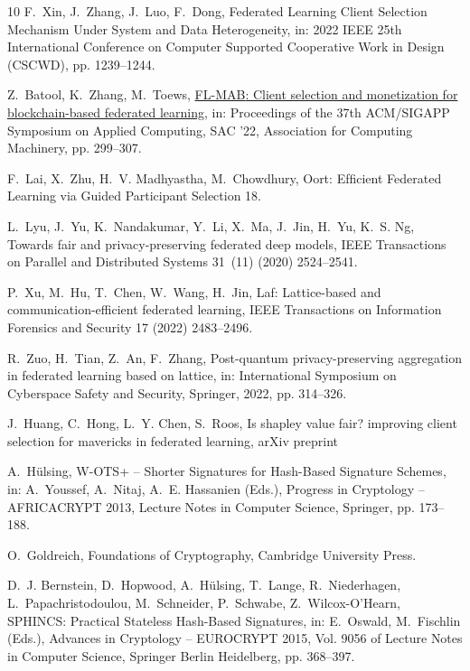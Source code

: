 \documentclass[lettersize,journal]{IEEEtran}
\begin{document}
\begin{thebibliography}{10}
F.~Xin, J.~Zhang, J.~Luo, F.~Dong, Federated {{Learning Client Selection
  Mechanism Under System}} and {{Data Heterogeneity}}, in: 2022 {{IEEE}} 25th
  {{International Conference}} on {{Computer Supported Cooperative Work}} in
  {{Design}} ({{CSCWD}}), pp. 1239--1244.


Z.~Batool, K.~Zhang, M.~Toews,
  \href{http://doi.org/10.1145/3477314.3507050}{{{FL-MAB}}: Client selection
  and monetization for blockchain-based federated learning}, in: Proceedings of
  the 37th {{ACM}}/{{SIGAPP Symposium}} on {{Applied Computing}}, {{SAC}} '22,
  {Association for Computing Machinery}, pp. 299--307.


F.~Lai, X.~Zhu, H.~V. Madhyastha, M.~Chowdhury, Oort: {{Efﬁcient Federated
  Learning}} via {{Guided Participant Selection}}  18.

L.~Lyu, J.~Yu, K.~Nandakumar, Y.~Li, X.~Ma, J.~Jin, H.~Yu, K.~S. Ng, Towards
  fair and privacy-preserving federated deep models, IEEE Transactions on
  Parallel and Distributed Systems 31~(11) (2020) 2524--2541.

P.~Xu, M.~Hu, T.~Chen, W.~Wang, H.~Jin, Laf: Lattice-based and
  communication-efficient federated learning, IEEE Transactions on Information
  Forensics and Security 17 (2022) 2483--2496.


R.~Zuo, H.~Tian, Z.~An, F.~Zhang, Post-quantum privacy-preserving aggregation
  in federated learning based on lattice, in: International Symposium on
  Cyberspace Safety and Security, Springer, 2022, pp. 314--326.

J.~Huang, C.~Hong, L.~Y. Chen, S.~Roos, Is shapley value fair? improving client
  selection for mavericks in federated learning, arXiv preprint


A.~Hülsing, W-{{OTS}}+ – {{Shorter Signatures}} for {{Hash-Based Signature
  Schemes}}, in: A.~Youssef, A.~Nitaj, A.~E. Hassanien (Eds.), Progress in
  {{Cryptology}} – {{AFRICACRYPT}} 2013, Lecture {{Notes}} in {{Computer
  Science}}, {Springer}, pp. 173--188.


O.~Goldreich, Foundations of Cryptography, {Cambridge University Press}.

D.~J. Bernstein, D.~Hopwood, A.~Hülsing, T.~Lange, R.~Niederhagen,
  L.~Papachristodoulou, M.~Schneider, P.~Schwabe, Z.~Wilcox-O’Hearn,
  {{SPHINCS}}: {{Practical Stateless Hash-Based Signatures}}, in: E.~Oswald,
  M.~Fischlin (Eds.), Advances in {{Cryptology}} -- {{EUROCRYPT}} 2015, Vol.
  9056 of Lecture {{Notes}} in {{Computer Science}}, {Springer Berlin
  Heidelberg}, pp. 368--397.



\end{thebibliography}
\end{document}
